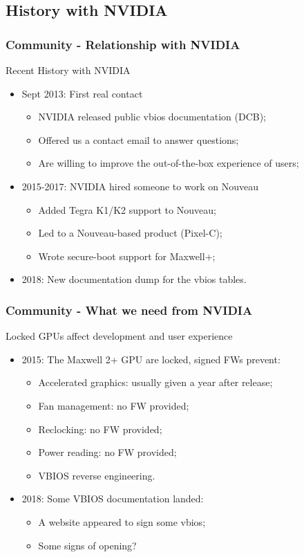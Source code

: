 \documentclass[11pt,english,compress]{beamer}
\begin{document}
\subsection{History with NVIDIA}
\begin{frame}
	\frametitle{Community - Relationship with NVIDIA}

	\begin{block}{Recent History with NVIDIA}
		\begin{itemize}
			\item Sept 2013: First real contact
			\begin{itemize}
				\item NVIDIA released public vbios documentation (DCB);
				\item Offered us a contact email to answer questions;
				\item Are willing to improve the out-of-the-box
experience of users;
			\end{itemize}
			\item 2015-2017: NVIDIA hired someone to work on Nouveau
			\begin{itemize}
				\item Added Tegra K1/K2 support to Nouveau;
				\item Led to a Nouveau-based product (Pixel-C);
				\item Wrote secure-boot support for Maxwell+;
			\end{itemize}
			\item 2018: New documentation dump for the vbios tables.
		\end{itemize}
	\end{block}
\end{frame}

\begin{frame}
	\frametitle{Community - What we need from NVIDIA}

	\begin{block}{Locked GPUs affect development and user experience}
		\begin{itemize}
			\item 2015: The Maxwell 2+ GPU are locked, signed FWs prevent:
			\begin{itemize}
				\item Accelerated graphics: usually given a year after release;
				\item Fan management: no FW provided;
				\item Reclocking: no FW provided;
				\item Power reading: no FW provided;
				\item VBIOS reverse engineering.
			\end{itemize}
			\item 2018: Some VBIOS documentation landed:
			\begin{itemize}
				\item A website appeared to sign some vbios;
				\item Some signs of opening?
			\end{itemize}
		\end{itemize}
	\end{block}
\end{frame}
\end{document}

